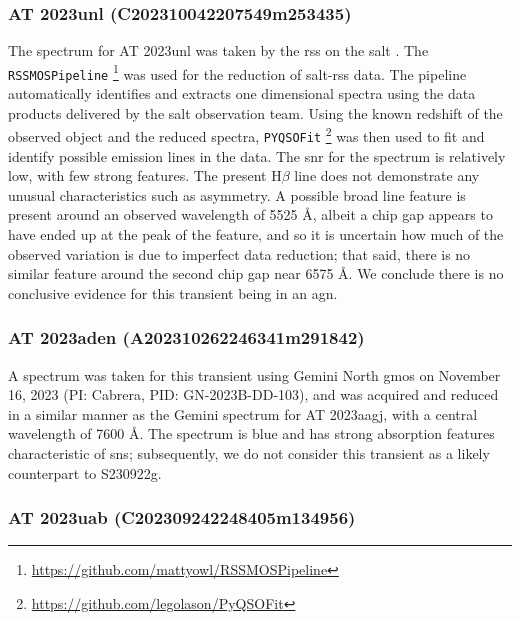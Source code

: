 \documentclass[twocolumn]{aastex631}
\newcommand{\gweventid}{S230922g\xspace}
\begin{document}
\subsubsection{AT 2023unl (C202310042207549m253435)}
\label{subsubsec:AT2023unl}

The spectrum for AT 2023unl was taken by the \gls{rss} \citep{burghPrimeFocusImaging2003, kobulnickyPrimeFocusImaging2003} on the \gls{salt} \citep{buckleyCompletionCommissioningSouthern2006}.
The \texttt{RSSMOSPipeline} \citep{2018ApJS..235...20H}\footnote{\url{https://github.com/mattyowl/RSSMOSPipeline}} was used for the reduction of \gls{salt}-\gls{rss} data.
The pipeline automatically identifies and extracts one dimensional spectra using the data products delivered by the \gls{salt} observation team.
Using the known redshift of the observed object and the reduced spectra, \texttt{PYQSOFit} \citep{2018ascl.soft09008G}\footnote{\url{https://github.com/legolason/PyQSOFit}} was then used to fit and identify possible emission lines in the data.
The \gls{snr} for the spectrum is relatively low, with few strong features.
The present H$\beta$ line does not demonstrate any unusual characteristics such as asymmetry.
A possible broad line feature is present around an observed wavelength of 5525 \AA, albeit a chip gap appears to have ended up at the peak of the feature, and so it is uncertain how much of the observed variation is due to imperfect data reduction; that said, there is no similar feature around the second chip gap near 6575 \AA. We conclude there is no conclusive evidence for this transient being in an \gls{agn}.

\subsubsection{AT 2023aden (A202310262246341m291842)}
\label{subsubsec:AT2023aden}

A spectrum was taken for this transient using Gemini North \gls{gmos} on November 16, 2023 (PI: Cabrera, PID: GN-2023B-DD-103), and was acquired and reduced in a similar manner as the Gemini spectrum for AT 2023aagj, with a central wavelength of 7600 \AA.
The spectrum is blue and has strong absorption features characteristic of \glspl{sn}; subsequently, we do not consider this transient as a likely counterpart to \gweventid.

\subsubsection{AT 2023uab (C202309242248405m134956)}
\label{subsubsec:AT2023uab}
\end{document}
